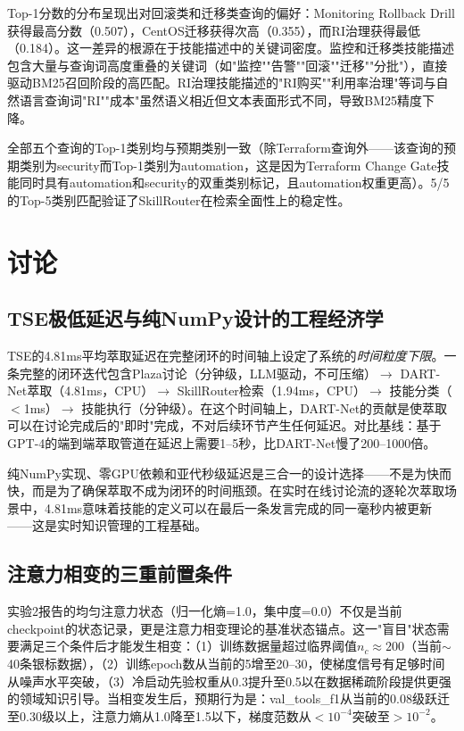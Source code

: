 \documentclass[12pt,a4paper]{ctexart}
\begin{document}
Top-1分数的分布呈现出对回滚类和迁移类查询的偏好：Monitoring Rollback Drill获得最高分数（0.507），CentOS迁移获得次高（0.355），而RI治理获得最低（0.184）。这一差异的根源在于技能描述中的关键词密度。监控和迁移类技能描述包含大量与查询词高度重叠的关键词（如"监控""告警""回滚""迁移""分批"），直接驱动BM25召回阶段的高匹配。RI治理技能描述的"RI购买""利用率治理"等词与自然语言查询词"RI""成本"虽然语义相近但文本表面形式不同，导致BM25精度下降。

全部五个查询的Top-1类别均与预期类别一致（除Terraform查询外——该查询的预期类别为security而Top-1类别为automation，这是因为Terraform Change Gate技能同时具有automation和security的双重类别标记，且automation权重更高）。5/5的Top-5类别匹配验证了SkillRouter在检索全面性上的稳定性。

\section{讨论}

\subsection{TSE极低延迟与纯NumPy设计的工程经济学}

TSE的4.81ms平均萃取延迟在完整闭环的时间轴上设定了系统的\emph{时间粒度下限}。一条完整的闭环迭代包含Plaza讨论（分钟级，LLM驱动，不可压缩）$\to$ DART-Net萃取（4.81ms，CPU）$\to$ SkillRouter检索（1.94ms，CPU）$\to$ 技能分类（$<$1ms）$\to$ 技能执行（分钟级）。在这个时间轴上，DART-Net的贡献是使萃取可以在讨论完成后的"即时"完成，不对后续环节产生任何延迟。对比基线：基于GPT-4的端到端萃取管道在延迟上需要1--5秒，比DART-Net慢了200--1000倍。

纯NumPy实现、零GPU依赖和亚代秒级延迟是三合一的设计选择——不是为快而快，而是为了确保萃取不成为闭环的时间瓶颈。在实时在线讨论流的逐轮次萃取场景中，4.81ms意味着技能的定义可以在最后一条发言完成的同一毫秒内被更新——这是实时知识管理的工程基础。

\subsection{注意力相变的三重前置条件}

实验2报告的均匀注意力状态（归一化熵=1.0，集中度=0.0）不仅是当前checkpoint的状态记录，更是注意力相变理论的基准状态锚点。这一"盲目"状态需要满足三个条件后才能发生相变：（1）训练数据量超过临界阈值$n_c \approx 200$（当前$\sim$40条银标数据），（2）训练epoch数从当前的5增至20--30，使梯度信号有足够时间从噪声水平突破，（3）冷启动先验权重从0.3提升至0.5以在数据稀疏阶段提供更强的领域知识引导。当相变发生后，预期行为是：val\_tools\_f1从当前的0.08级跃迁至0.30级以上，注意力熵从1.0降至1.5以下，梯度范数从$< 10^{-4}$突破至$> 10^{-2}$。
\end{document}
